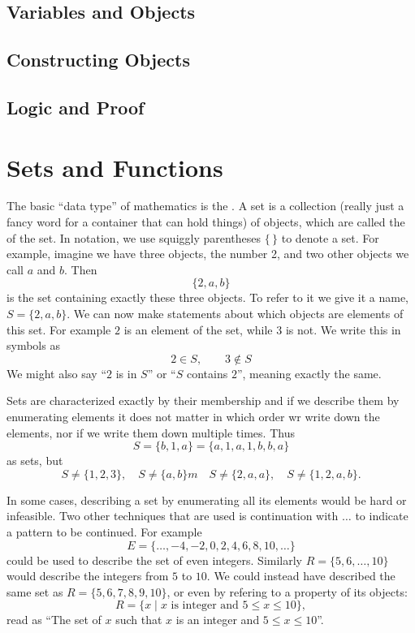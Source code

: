 \section{Variables and Objects}

\section{Constructing Objects}

\section{Logic and Proof}

\chapter{Sets and Functions}

The basic ``data type'' of mathematics is the . A set is a
collection (really just a fancy word for a container that can hold things)
of objects, which are called the  of the set. In notation,
we use squiggly parentheses $\{\,\}$ to denote a set.
For example,
imagine we have three objects, the number 2, and two other objects we call
$a$ and $b$. Then 
\[
\{2,a,b\}
\]
is the set containing exactly these three objects. To refer to it we give it
a name, $S=\{2,a,b\}$. 
We can now make statements about which objects are elements of this set. For
example $2$ is an element of the set, while $3$ is not. We write this in symbols as
\[
2\in S,\qquad 3\not\in S
\]
We might also say ``$2$ is in $S$'' or ``$S$ contains $2$'', meaning exactly
the same.

Sets are characterized exactly by their membership and if we describe them
by enumerating elements it does not matter in which order wr write down the
elements, nor if we write them down multiple times.
Thus
\[
S=\{b,1,a\}=\{a,1,a,1,b,b,a\}
\]
as sets, but 
\[
S\not=\{1,2,3\},\quad S\not=\{a,b\}m\quad S\not=\{2,a,a\},\quad
S\not=\{1,2,a,b\}.
\]

In some cases, describing a set by enumerating all its elements would be
hard or infeasible. Two other techniques that are used is continuation with
$\ldots$ to indicate a pattern to be continued. For example
\[
E=\{\ldots,-4,-2,0,2,4,6,8,10,\ldots\}
\]
could be used to describe the set of even integers. Similarly
$R=\{5,6,\ldots,10\}$ would describe the integers from $5$ to $10$. We could
instead have described the same set as $R=\{5,6,7,8,9,10\}$, or even by
refering to a property of its objects:
\[
R=\{x\mid \mbox{$x$ is integer and $5\le x\le 10$}\},
\]
read as ``The set of $x$ such that $x$ is an integer and $5\le x\le 10$''.


